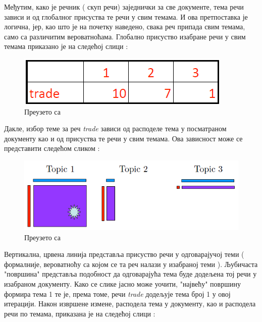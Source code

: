 Међутим, како је речник ( скуп речи) заједнички за све документе, тема речи зависи и од глобалног присуства те речи у свим темама. И ова претпоставка је логична, јер, као што је на почетку наведено, свака реч припада свим темама, само са различитим вероватноћама. Глобално присуство изабране речи у свим темама приказано је на следећој слици :

\begin{figure}[H]
    \centering
   \includegraphics[scale=0.6]{./Slike/slika9.png} 
	\caption{Преузето са \cite{mimno1}}
	\label{fig:slika9}
\end{figure}


Дакле, избор теме за реч \textit{trade}  зависи од расподеле тема у посматраном документу као и од присуства те речи у свим темама. Ова зависност може се представити следећом сликом :

\begin{figure}[H]
    \centering
   \includegraphics[scale=0.6]{./Slike/slika10.png} 
	\caption{Преузето са \cite{mimno1}}
	\label{fig:slika10}
\end{figure}

Вертикална, црвена линија представља присуство речи у одговарајучој теми ( формалније, вероватноћу са којом се та реч налази у изабраној теми ). Љубичаста "површина" представља подобност да одговарајућа тема буде додељена тој речи у изабраном документу. Како се слике јасно може уочити, "највећу"  површину формира тема 1 те је, према томе, речи  \textit{trade} додељује тема број 1 у овој итерацији. Након извршене измене, расподела тема у документу, као и расподела речи по темама, приказана је на следећој слици :



